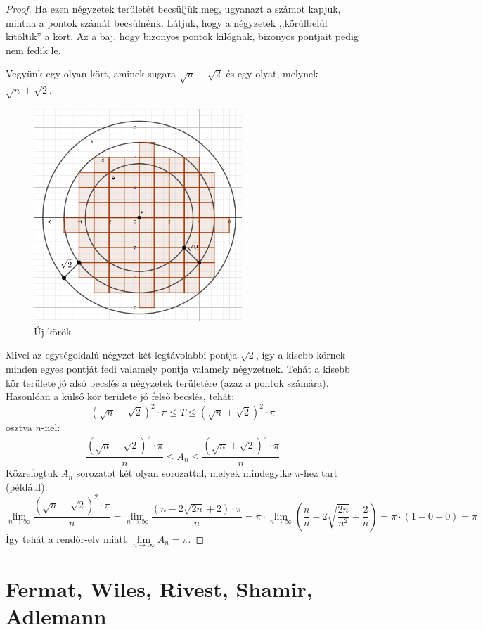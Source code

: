 \documentclass[12pt]{book}
\theoremstyle{plain} %
\theoremstyle{definition} %
\theoremstyle{remark}
\numberwithin{equation}{section}  %
\begin{document}
\begin{proof}
		Ha ezen négyzetek területét becsüljük meg, ugyanazt a számot kapjuk, mintha a pontok számát becsülnénk. Látjuk, hogy a négyzetek ,,körülbelül kitöltik'' a kört. Az a baj, hogy bizonyos pontok kilógnak, bizonyos pontjait pedig nem fedik le.
		
		Vegyünk egy olyan kört, aminek sugara $\sqrt{n}-\sqrt{2}$ és egy olyat, melynek $\sqrt{n}+\sqrt{2}$.
		
		\begin{figure}[h] %
			\centering
			\includegraphics[height=8cm]{abszampar3.png}
			\caption{Új körök}\label{abszampar3}
		\end{figure}
		
		Mivel az egységoldalú négyzet két legtávolabbi pontja $\sqrt{2}$, így a kisebb körnek minden egyes pontját fedi valamely pontja valamely négyzetnek. Tehát a kisebb kör területe jó alsó becslés a négyzetek területére (azaz a pontok számára). Hasonlóan a külső kör területe jó felső becslés, tehát:
		\[ (\sqrt{n}-\sqrt{2})^2\cdot \pi  \leq  T\leq  (\sqrt{n}+\sqrt{2})^2\cdot \pi  \]
		osztva $n$-nel:
		\[ \dfrac{(\sqrt{n}-\sqrt{2})^2\cdot \pi}{n} \leq A_n \leq  \dfrac{(\sqrt{n}+\sqrt{2})^2\cdot \pi}{n} \]
		Közrefogtuk $A_n$ sorozatot két olyan sorozattal, melyek mindegyike $\pi$-hez tart (például):
		\[ \lim\limits_{n\to\infty} \dfrac{(\sqrt{n}-\sqrt{2})^2\cdot \pi}{n} = \lim\limits_{n\to\infty} \dfrac{(n-2\sqrt{2n}+2)\cdot \pi}{n} = \pi\cdot  \lim\limits_{n\to\infty} \left( \dfrac{n}{n} -2 \sqrt{\dfrac{2n}{n^2}} + \dfrac{2}{n} \right) = \pi \cdot (1-0+0) = \pi  \]
		Így tehát a rendőr-elv miatt $\lim\limits_{n\to \infty} A_n = \pi$.
	\end{proof}


	\chapter{Fermat, Wiles, Rivest, Shamir, Adlemann}
	
\end{document}
